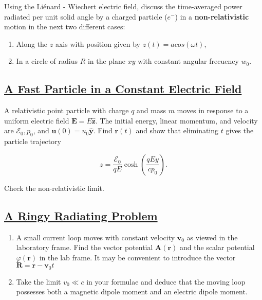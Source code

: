 Using the Liénard - Wiechert electric field, discuss the time-averaged power radiated per unit solid angle by a charged particle ($e^{-}$) in a \textbf{non-relativistic} motion in the next two different cases:

\begin{enumerate}
	\item Along the $z$ axis with position given by $z(t)= a cos (\omega t)$,
	\item In a circle of radius $R$ in the plane $xy$ with constant angular frecuency $w_{0}$.
\end{enumerate} 

\subsection{\hyperref[A Fast Particle in a Constant Electric Field]{A Fast Particle in a Constant Electric Field}}

A relativistic point particle with charge $q$ and mass $m$ moves in response to a uniform electric field $\mathbf{E}=E \hat{\mathbf{z}}$. The initial energy, linear momentum, and velocity are $\mathcal{E}_{0}, p_{0}$, and $\mathbf{u}(0)=u_{0} \hat{\mathbf{y}} .$ Find $\mathbf{r}(t)$ and show that eliminating $t$ gives the particle trajectory

\begin{equation}
z=\frac{\mathcal{E}_{0}}{q E} \cosh \left(\frac{q E y}{c p_{0}}\right).
\end{equation}

Check the non-relativistic limit.

\subsection{\hyperref[A Ringy Radiating Problem]{A Ringy Radiating Problem}}

\begin{enumerate}
	\item A small current loop moves with constant velocity $\mathbf{v}_{0}$ as viewed in the laboratory frame. Find the vector potential $\mathbf{A}(\mathbf{r})$ and the scalar potential $\varphi(\mathbf{r})$ in the lab frame. It may be convenient to introduce the vector $\mathbf{R}=\mathbf{r}-\mathbf{v}_{0} t$
	\item Take the limit $v_{0} \ll c$ in your formulae and deduce that the moving loop possesses both a magnetic dipole moment and an electric dipole moment.
\end{enumerate}






